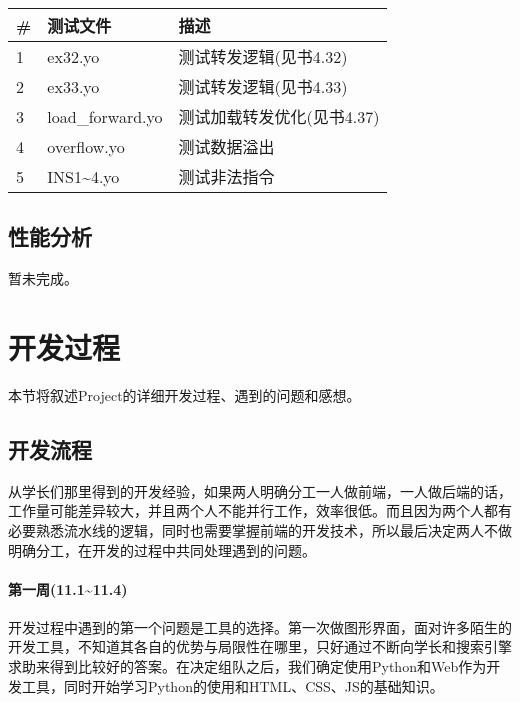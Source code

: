\documentclass[12pt]{article} %
\begin{document}
\begin{sloppypar}
\begin{table}[h]
\begin{tabular}{|l|l|l|}
\hline
{\bf \#} & {\bf 测试文件}                          & {\bf 描述}                   \\ 
\hline
1        & ex32.yo	                   & 测试转发逻辑(见书4.32)        \\ 
\hline
2        & ex33.yo                       & 测试转发逻辑(见书4.33)           \\ 
\hline
3        & load\_forward.yo	        & 测试加载转发优化(见书4.37)            \\ 
\hline
4        & overflow.yo          & 测试数据溢出               \\ 
\hline
5        & INS1\~{}4.yo             & 测试非法指令                   \\ 
\hline
\end{tabular}
\end{table}

\subsection{性能分析}

暂未完成。

\clearpage
\section{开发过程}

本节将叙述Project的详细开发过程、遇到的问题和感想。

\subsection{开发流程}

从学长们那里得到的开发经验，如果两人明确分工一人做前端，一人做后端的话，工作量可能差异较大，并且两个人不能并行工作，效率很低。而且因为两个人都有必要熟悉流水线的逻辑，同时也需要掌握前端的开发技术，所以最后决定两人不做明确分工，在开发的过程中共同处理遇到的问题。

\paragraph{第一周(11.1\~{}11.4)}

开发过程中遇到的第一个问题是工具的选择。第一次做图形界面，面对许多陌生的开发工具，不知道其各自的优势与局限性在哪里，只好通过不断向学长和搜索引擎求助来得到比较好的答案。在决定组队之后，我们确定使用Python和Web作为开发工具，同时开始学习Python的使用和HTML、CSS、JS的基础知识。


\end{sloppypar}
\end{document}
